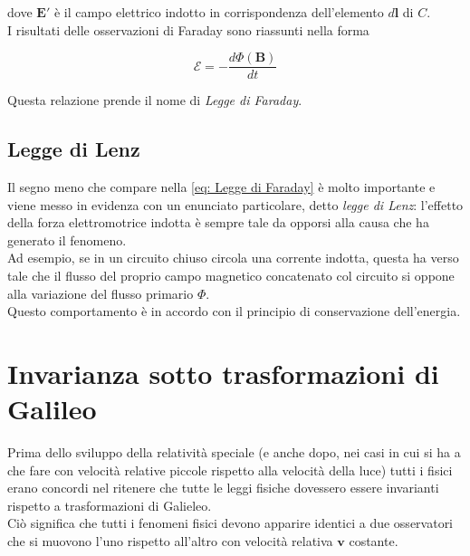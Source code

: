 dove $\mathbf{E}'$ è il campo elettrico indotto in corrispondenza dell'elemento $d \mathbf{l}$ di $C$. \\

I risultati delle osservazioni di Faraday sono riassunti nella forma

\begin{tcolorbox}[colback=yellow!10!white, colframe=orange!70!black, boxrule=0.8pt]
\begin{equation} \label{eq: Legge di Faraday}
\mathcal{E} = -\frac{d\Phi (\mathbf{B})}{dt}
\end{equation}
\end{tcolorbox}

Questa relazione prende il nome di \emph{Legge di Faraday}.  \\

\newpage

\subsection{Legge di Lenz}

Il segno meno che compare nella \ref{eq: Legge di Faraday} è molto importante e viene messo in evidenza con un enunciato particolare, detto \emph{legge di Lenz}: l'effetto della forza elettromotrice indotta è sempre tale da opporsi alla causa che ha generato il fenomeno. \\

Ad esempio, se in un circuito chiuso circola una corrente indotta, questa ha verso tale che il flusso del proprio campo magnetico concatenato col circuito si oppone alla variazione del flusso primario $\Phi$.\\

Questo comportamento è in accordo con il principio di conservazione dell'energia. 

\section{Invarianza sotto trasformazioni di Galileo}

Prima dello sviluppo della relatività speciale (e anche dopo, nei casi in cui si ha a che fare con velocità relative piccole rispetto alla velocità della luce) tutti i fisici erano concordi nel ritenere che tutte le leggi fisiche dovessero essere invarianti rispetto a trasformazioni di Galieleo. \\

Ciò significa che tutti i fenomeni fisici devono apparire identici a due osservatori che si muovono l'uno rispetto all'altro con velocità relativa $\mathbf{v}$ costante.\\

